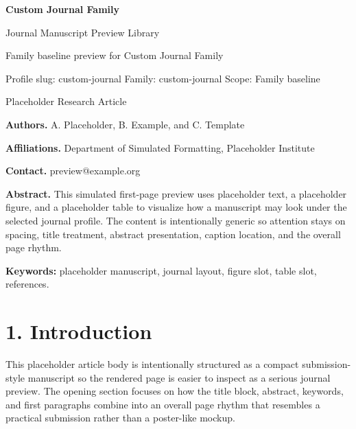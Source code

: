 \documentclass[10pt,a4paper]{article}
\begin{document}
\begin{center}
{\LARGE\bfseries Custom Journal Family}\par
\vspace{0.25em}
{\small Journal Manuscript Preview Library}\par
\vspace{0.15em}
{\footnotesize Family baseline preview for Custom Journal Family}\par
\vspace{0.2em}
{\footnotesize Profile slug: custom-journal \quad Family: custom-journal \quad Scope: Family baseline}
\end{center}
\vspace{0.2em}
 Placeholder Research Article\par\vspace{0.4em}


\noindent\textbf{Authors.} A. Placeholder, B. Example, and C. Template\par
\noindent\textbf{Affiliations.} Department of Simulated Formatting, Placeholder Institute\par
\noindent\textbf{Contact.} preview@example.org\par
\vspace{0.4em}
\noindent\textbf{Abstract.} This simulated first-page preview uses placeholder text, a placeholder figure, and a placeholder table to visualize how a manuscript may look under the selected journal profile. The content is intentionally generic so attention stays on spacing, title treatment, abstract presentation, caption location, and the overall page rhythm.\par\vspace{0.6em}
\noindent\textbf{Keywords:} placeholder manuscript, journal layout, figure slot, table slot, references.\par\vspace{0.6em}


\small
\section*{1. Introduction}
This placeholder article body is intentionally structured as a compact submission-style manuscript so the rendered page is easier to inspect as a serious journal preview. The opening section focuses on how the title block, abstract, keywords, and first paragraphs combine into an overall page rhythm that resembles a practical submission rather than a poster-like mockup.
\end{document}
